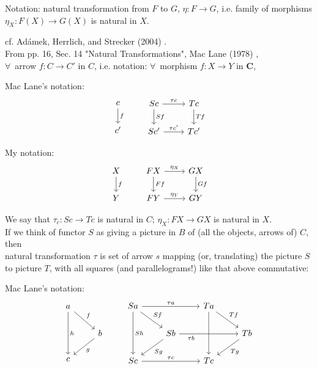 Notation: natural transformation from $F$ to $G$, $\eta:F \to G$, i.e. family of morphisms $\eta_X : F(X) \to G(X)$ is natural in $X$.

cf. Ad\'{a}mek, Herrlich, and Strecker (2004) \cite{agat:AHS2004}.  \\

From pp. 16, Sec. 14 "Natural Transformations", Mac Lane (1978) \cite{agat:MacL1978}, \\

$\forall \,$ arrow $f: C \to C'$ in $C$, i.e. notation: $\forall \, $ morphism $f:X \to Y$ in $\mathbf{C}$, 

Mac Lane's notation:
\[
\begin{gathered}
\begin{tikzcd} 
c \arrow{d}{f} \\
c'
\end{tikzcd} \qquad \, 
\begin{tikzcd}
Sc \arrow{d}{Sf} \arrow{r}{\tau c} & Tc \arrow{d}{Tf} \\
Sc' \arrow{r}{\tau c'} & Tc'
\end{tikzcd}
\end{gathered}
\]

My notation:
\[
\begin{gathered}
\begin{tikzcd} 
X \arrow{d}{f} \\
Y
\end{tikzcd} \qquad \,
\begin{tikzcd}
FX \arrow{d}{Ff} \arrow{r}{\eta_X} & GX \arrow{d}{Gf} \\
FY \arrow{r}{\eta_Y} & GY
\end{tikzcd}
\end{gathered}
\]

We say that $\tau_c : Sc \to Tc$ is natural in $C$; $\eta_X : FX \to GX$ is natural in $X$. \\

If we think of functor $S$ as giving a picture in $B$ of (all the objects, arrows of) $C$, then \\
natural transformation $\tau$ is set of arrow $s$ mapping (or, translating) the picture $S$ to picture $T$, with all squares (and parallelograms!) like that above commutative:

Mac Lane's notation:
\[
\begin{gathered}
\begin{tikzcd}
a \arrow{dr}{f} \arrow{dd}{h} & \\
& b \arrow{dl}{g} \\ 
c & 
\end{tikzcd} \qquad \, 
\begin{tikzcd}
Sa \arrow{dr}{Sf} \arrow{dd}{Sh} \arrow{rr}{\tau a} & & Ta \arrow[dd, crossing over]{} \arrow{dr}{Tf} &  \\
& Sb \arrow{dl}{Sg} \arrow{rr}[swap, pos=0.2]{\tau b} & & Tb \arrow{dl}{Tg} \\ 
Sc \arrow{rr}{\tau c} & & Tc & 
\end{tikzcd} 
\end{gathered}
\]

